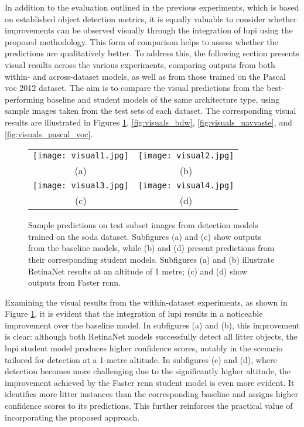In addition to the evaluation outlined in the previous experiments, which is based on established object detection metrics, it is equally valuable to consider whether improvements can be observed visually through the integration of \gls{lupi} using the proposed methodology. This form of comparison helps to assess whether the predictions are qualitatively better. To address this, the following section presents visual results across the various experiments, comparing outputs from both within- and across-dataset models, as well as from those trained on the Pascal \gls{voc} 2012 dataset. 
The aim is to compare the visual predictions from the best-performing baseline and student models of the same architecture type, using sample images taken from the test sets of each dataset. The corresponding visual results are illustrated in Figures \ref{fig:visuals_soda}, \ref{fig:visuals_bdw}, \ref{fig:visuals_uavvaste}, and \ref{fig:visuals_pascal_voc}.

\begin{figure}[!ht]
  \centering
  \begin{tabular}{cc}
    \texttt{[image: visual1.jpg]} &
    \texttt{[image: visual2.jpg]} \\
    \small (a) & \small (b) \\
    \addlinespace[1em]
    \texttt{[image: visual3.jpg]} &
    \texttt{[image: visual4.jpg]} \\
    \small (c) & \small (d) \\
  \end{tabular}
  \caption{Sample predictions on test subset images from detection models trained on the \gls{soda} dataset. Subfigures (a) and (c) show outputs from the baseline models, while (b) and (d) present predictions from their corresponding student models. Subfigures (a) and (b) illustrate RetinaNet results at an altitude of 1 metre; (c) and (d) show outputs from Faster \gls{rcnn}.}
  \label{fig:visuals_soda}
\end{figure}

Examining the visual results from the within-dataset experiments, as shown in Figure \ref{fig:visuals_soda}, it is evident that the integration of \gls{lupi} results in a noticeable improvement over the baseline model. In subfigures (a) and (b), this improvement is clear: although both RetinaNet models successfully detect all litter objects, the \gls{lupi} student model produces higher confidence scores, notably in the scenario tailored for detection at a 1-metre altitude.
In subfigures (c) and (d), where detection becomes more challenging due to the significantly higher altitude, the improvement achieved by the Faster \gls{rcnn} student model is even more evident. It identifies more litter instances than the corresponding baseline and assigns higher confidence scores to its predictions. This further reinforces the practical value of incorporating the proposed approach.

